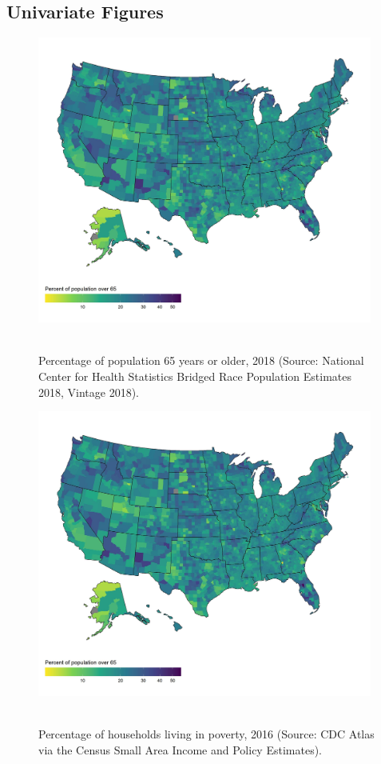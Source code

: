 \documentclass{article}
\begin{document}
\subsection{\textbf{Univariate Figures}}
\begin{figure}[!h] 
    \centering
    \caption{Percentage of population 65 years or older, 2018 (Source: National Center for Health Statistics Bridged Race Population Estimates 2018, Vintage 2018).}
    \includegraphics[width=11cm]{figures/univariate/figU01_p_65yo.jpg}
    \
\end{figure}
\FloatBarrier

\begin{figure}[!h] 
    \centering
    \caption{Percentage of households living in poverty, 2016 (Source: CDC Atlas via the Census Small Area Income and Policy Estimates).}
    \includegraphics[width=11cm]{figures/univariate/figU02_poverty.jpg}
    \
\end{figure}
\FloatBarrier
\end{document}
